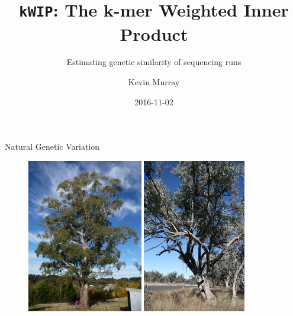 \documentclass[t]{beamer}
\title{\texttt{kWIP}: The k-mer Weighted Inner Product}
\subtitle{Estimating genetic similarity of sequencing runs}
\author{Kevin Murray}
\institute{PhD Candidate\\ Borevitz Lab, ANU}
\date{2016-11-02}
\begin{document}
{
\begin{frame}
  \titlepage
  \vfill
\end{frame}
}

\begin{frame}{Natural Genetic Variation}
  \begin{figure}
    \centering
    \includegraphics[width=0.45\textwidth]{img/euc.jpg}
    \includegraphics[width=0.4\textwidth]{img/albens.jpg}
  \end{figure}
\end{frame}
\end{document}
